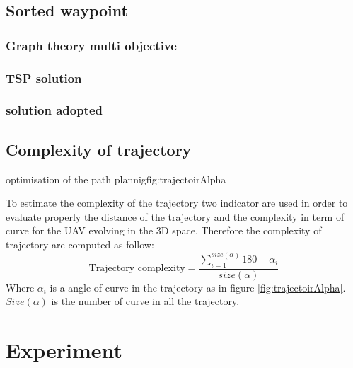 			\subsection{Sorted waypoint}
				\subsubsection{Graph theory multi objective  }
				\subsubsection{TSP solution }
				\subsubsection{solution adopted}
				\subsection{Complexity of trajectory }\label{tarjectory}
%

 \begin{mfigures}[!]{optimisation of the path plannig}{fig:trajectoirAlpha} \centering
{}
\end{mfigures} 

To estimate the complexity of the trajectory two indicator are used in order to evaluate properly the distance of the trajectory and the complexity in term of curve for the UAV evolving in the 3D space.
Therefore the complexity of trajectory are computed as follow: 
\begin{equation}\label{Eq:trajectory}
\mbox{Trajectory complexity}=\frac{ \sum_{i=1}^{size(\alpha)} 180- \alpha_{i}  }{size(\alpha)}   
\end{equation}
Where $\alpha_i$ is a angle of curve in the trajectory as in figure \ref{fig:trajectoirAlpha}. \\
$Size(\alpha)$ is the number of curve in all the trajectory.\\

			\section{Experiment}
